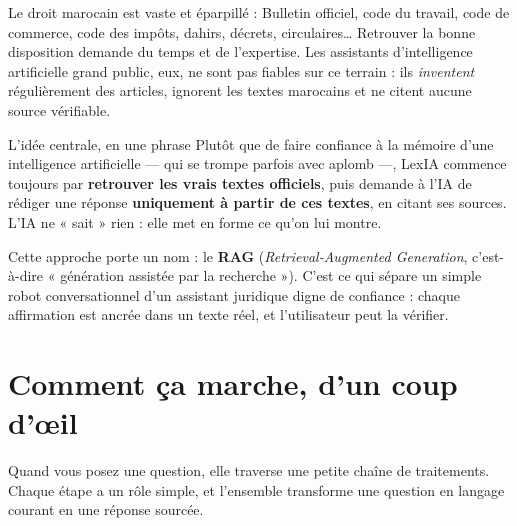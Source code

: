 \documentclass[11pt,a4paper]{article}
\begin{document}
Le droit marocain est vaste et éparpillé : Bulletin officiel, code du travail, code de commerce,
code des impôts, dahirs, décrets, circulaires… Retrouver la bonne disposition demande du temps et de
l'expertise. Les assistants d'intelligence artificielle grand public, eux, ne sont pas fiables sur ce
terrain : ils \emph{inventent} régulièrement des articles, ignorent les textes marocains et ne citent
aucune source vérifiable.

\begin{encadre}{L'idée centrale, en une phrase}
Plutôt que de faire confiance à la mémoire d'une intelligence artificielle --- qui se trompe parfois
avec aplomb ---, LexIA commence toujours par \textbf{retrouver les vrais textes officiels}, puis
demande à l'IA de rédiger une réponse \textbf{uniquement à partir de ces textes}, en citant ses
sources. L'IA ne « sait » rien : elle met en forme ce qu'on lui montre.
\end{encadre}

Cette approche porte un nom : le \textbf{RAG} (\textit{Retrieval-Augmented Generation}, c'est-à-dire
« génération assistée par la recherche »). C'est ce qui sépare un simple robot conversationnel d'un
assistant juridique digne de confiance : chaque affirmation est ancrée dans un texte réel, et
l'utilisateur peut la vérifier.

\section{Comment ça marche, d'un coup d'œil}

Quand vous posez une question, elle traverse une petite chaîne de traitements. Chaque étape a un rôle
simple, et l'ensemble transforme une question en langage courant en une réponse sourcée.

\begin{center}
\end{center}
\end{document}
